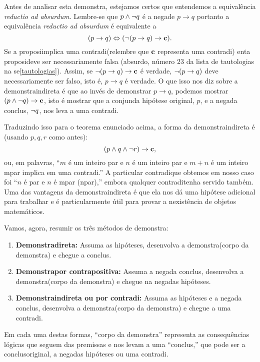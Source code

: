 Antes de analisar esta demonstra\caoi, estejamos certos que entendemos a equival\^encia \emph{reductio ad absurdum}. Lembre-se que $p\wedge\lnot q$ \'e a nega\cao de $p\to q$ portanto a equival\^encia \emph{reductio ad absurdum} \'e equivalente a
\[
(p\to q)\Leftrightarrow (\lnot(p\to q)\to {\bf c}).
\]
Se a proposi\cao implica uma contradi\cao (relembre que ${\bf c}$ representa uma contradi\caoi) ent\ao a proposi\cao deve ser necessariamente falsa (absurdo, n\'umero 23 da lista de tautologias na se\cao \ref{tautologias}). Assim, se $\lnot(p\to q)\to {\bf c}$ \'e verdade, $\lnot(p\to q)$ deve necessariamente ser falso, isto \'e, $p\to q$ \'e verdade. O que isso nos diz sobre a demonstra\cao indireta \'e que ao inv\'es  de demonstrar $p\to q$, podemos mostrar $(p\wedge\lnot q)\to {\bf c}$, isto \'e mostrar que a conjun\cao da hip\'otese original, $p$, e a nega\cao da conclus\aoi, $\lnot q$, nos leva a uma contradi\caoi.

Traduzindo isso para o teorema enunciado acima, a forma da demonstra\cao indireta \'e (usando $p,q,r$ como antes):
\[
(p\wedge q \wedge\lnot r)\to {\bf c},
\]
ou, em palavras, ``$m$ \'e um inteiro par e $n$ \'e um inteiro par e $m+n$ \'e um inteiro \ih mpar implica em uma contradi\caoi.'' A particular contradi\cao que obtemos em nosso caso foi ``$n$ \'e par e $n$ \'e \ih mpar (n\ao par),'' embora qualquer contradi\cao tenha servido tamb\'em. Uma das vantagens da demonstra\cao indireta \'e que ela nos d\'a uma hip\'otese adicional para trabalhar e \'e particularmente \'util para provar a n\ao exist\^encia de objetos matem\'aticos.

Vamos, agora, resumir os tr\^es m\'etodos de demonstra\caoi:
\begin{enumerate}[{\bf a)}]
\item {\bf Demonstra\cao direta:} Assuma as hip\'oteses, desenvolva a demonstra\cao (corpo da demonstra\caoi) e chegue a conclus\aoi.
\item {\bf Demonstra\cao por contrapositiva:} Assuma a nega\cao da conclus\aoi, desenvolva a demonstra\cao (corpo da demonstra\caoi) e chegue na nega\cao das hip\'oteses.
\item {\bf Demonstra\cao indireta ou por contradi\caoi:} Assuma as hip\'oteses e a nega\cao da conclus\aoi, desenvolva a demonstra\cao (corpo da demonstra\caoi) e chegue a uma contradi\caoi.
\end{enumerate}
Em cada uma destas formas, ``corpo da demonstra\caoi'' representa as consequ\^encias l\'ogicas que seguem das premissas e nos levam a uma ``conclus\aoi,'' que pode ser a conclus\ao original, a nega\cao das hip\'oteses ou uma contradi\caoi.

